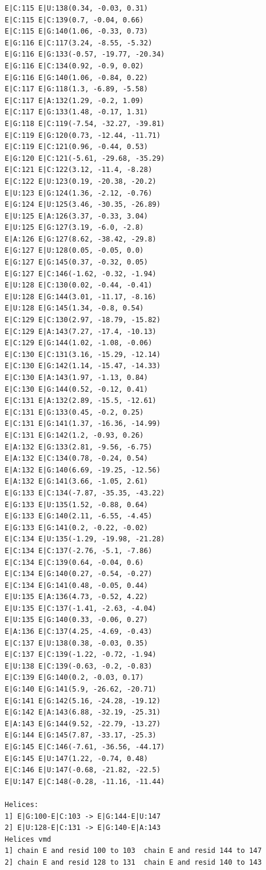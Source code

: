 \documentclass[12pt]{article}
\begin{document}
\begin{appendices}
\begin{scriptsize}
\begin{lstlisting}
E|C:115 E|U:138(0.34, -0.03, 0.31)
E|C:115 E|C:139(0.7, -0.04, 0.66)
E|C:115 E|G:140(1.06, -0.33, 0.73)
E|G:116 E|C:117(3.24, -8.55, -5.32)
E|G:116 E|G:133(-0.57, -19.77, -20.34)
E|G:116 E|C:134(0.92, -0.9, 0.02)
E|G:116 E|G:140(1.06, -0.84, 0.22)
E|C:117 E|G:118(1.3, -6.89, -5.58)
E|C:117 E|A:132(1.29, -0.2, 1.09)
E|C:117 E|G:133(1.48, -0.17, 1.31)
E|G:118 E|C:119(-7.54, -32.27, -39.81)
E|C:119 E|G:120(0.73, -12.44, -11.71)
E|C:119 E|C:121(0.96, -0.44, 0.53)
E|G:120 E|C:121(-5.61, -29.68, -35.29)
E|C:121 E|C:122(3.12, -11.4, -8.28)
E|C:122 E|U:123(0.19, -20.38, -20.2)
E|U:123 E|G:124(1.36, -2.12, -0.76)
E|G:124 E|U:125(3.46, -30.35, -26.89)
E|U:125 E|A:126(3.37, -0.33, 3.04)
E|U:125 E|G:127(3.19, -6.0, -2.8)
E|A:126 E|G:127(8.62, -38.42, -29.8)
E|G:127 E|U:128(0.05, -0.05, 0.0)
E|G:127 E|G:145(0.37, -0.32, 0.05)
E|G:127 E|C:146(-1.62, -0.32, -1.94)
E|U:128 E|C:130(0.02, -0.44, -0.41)
E|U:128 E|G:144(3.01, -11.17, -8.16)
E|U:128 E|G:145(1.34, -0.8, 0.54)
E|C:129 E|C:130(2.97, -18.79, -15.82)
E|C:129 E|A:143(7.27, -17.4, -10.13)
E|C:129 E|G:144(1.02, -1.08, -0.06)
E|C:130 E|C:131(3.16, -15.29, -12.14)
E|C:130 E|G:142(1.14, -15.47, -14.33)
E|C:130 E|A:143(1.97, -1.13, 0.84)
E|C:130 E|G:144(0.52, -0.12, 0.41)
E|C:131 E|A:132(2.89, -15.5, -12.61)
E|C:131 E|G:133(0.45, -0.2, 0.25)
E|C:131 E|G:141(1.37, -16.36, -14.99)
E|C:131 E|G:142(1.2, -0.93, 0.26)
E|A:132 E|G:133(2.81, -9.56, -6.75)
E|A:132 E|C:134(0.78, -0.24, 0.54)
E|A:132 E|G:140(6.69, -19.25, -12.56)
E|A:132 E|G:141(3.66, -1.05, 2.61)
E|G:133 E|C:134(-7.87, -35.35, -43.22)
E|G:133 E|U:135(1.52, -0.88, 0.64)
E|G:133 E|G:140(2.11, -6.55, -4.45)
E|G:133 E|G:141(0.2, -0.22, -0.02)
E|C:134 E|U:135(-1.29, -19.98, -21.28)
E|C:134 E|C:137(-2.76, -5.1, -7.86)
E|C:134 E|C:139(0.64, -0.04, 0.6)
E|C:134 E|G:140(0.27, -0.54, -0.27)
E|C:134 E|G:141(0.48, -0.05, 0.44)
E|U:135 E|A:136(4.73, -0.52, 4.22)
E|U:135 E|C:137(-1.41, -2.63, -4.04)
E|U:135 E|G:140(0.33, -0.06, 0.27)
E|A:136 E|C:137(4.25, -4.69, -0.43)
E|C:137 E|U:138(0.38, -0.03, 0.35)
E|C:137 E|C:139(-1.22, -0.72, -1.94)
E|U:138 E|C:139(-0.63, -0.2, -0.83)
E|C:139 E|G:140(0.2, -0.03, 0.17)
E|G:140 E|G:141(5.9, -26.62, -20.71)
E|G:141 E|G:142(5.16, -24.28, -19.12)
E|G:142 E|A:143(6.88, -32.19, -25.31)
E|A:143 E|G:144(9.52, -22.79, -13.27)
E|G:144 E|G:145(7.87, -33.17, -25.3)
E|G:145 E|C:146(-7.61, -36.56, -44.17)
E|G:145 E|U:147(1.22, -0.74, 0.48)
E|C:146 E|U:147(-0.68, -21.82, -22.5)
E|U:147 E|C:148(-0.28, -11.16, -11.44)

Helices: 
1] E|G:100-E|C:103 -> E|G:144-E|U:147
2] E|U:128-E|C:131 -> E|G:140-E|A:143
Helices vmd
1] chain E and resid 100 to 103  chain E and resid 144 to 147
2] chain E and resid 128 to 131  chain E and resid 140 to 143


\end{lstlisting}
\end{scriptsize}
\end{appendices}
\end{document}
